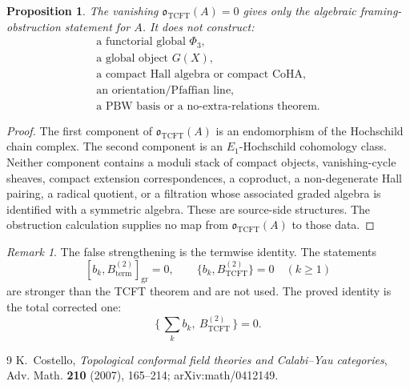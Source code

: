 \documentclass[11pt]{amsart}
\providecommand{\TCFT}{\mathrm{TCFT}}
\newtheorem{proposition}[theorem]{Proposition}
\theoremstyle{definition}
\theoremstyle{remark}
\newtheorem{remark}[theorem]{Remark}
\begin{document}
\begin{proposition}
The vanishing \(\mathfrak{o}_{\TCFT}(A)=0\) gives only the algebraic
framing-obstruction statement for \(A\).  It does not construct:
\[
\begin{array}{l}
\text{a functorial global }\Phi_3,\\
\text{a global object }G(X),\\
\text{a compact Hall algebra or compact CoHA},\\
\text{an orientation/Pfaffian line},\\
\text{a PBW basis or a no-extra-relations theorem}.
\end{array}
\]
\end{proposition}

\begin{proof}
The first component of \(\mathfrak{o}_{\TCFT}(A)\) is an endomorphism of the
Hochschild chain complex.  The second component is an
\(E_1\)-Hochschild cohomology class.  Neither component contains a moduli
stack of compact objects, vanishing-cycle sheaves, compact extension
correspondences, a coproduct, a non-degenerate Hall pairing, a radical
quotient, or a filtration whose associated graded algebra is identified
with a symmetric algebra.  These are source-side structures.  The
obstruction calculation supplies no map from
\(\mathfrak{o}_{\TCFT}(A)\) to those data.
\end{proof}

\begin{remark}
The false strengthening is the termwise identity.  The statements
\[
        [b_k,B^{(2)}_{\mathrm{term}}]_{\mathrm{gr}}=0,\qquad
        \{b_k,B^{(2)}_{\TCFT}\}=0\quad(k\geq1)
\]
are stronger than the TCFT theorem and are not used.  The proved identity is
the total corrected one:
\[
        \{\,\sum_k b_k,\ B^{(2)}_{\TCFT}\,\}=0 .
\]
\end{remark}

\begin{thebibliography}{9}
K.~Costello,
\emph{Topological conformal field theories and Calabi--Yau categories},
Adv. Math. \textbf{210} (2007), 165--214; arXiv:math/0412149.
\end{thebibliography}
\end{document}
